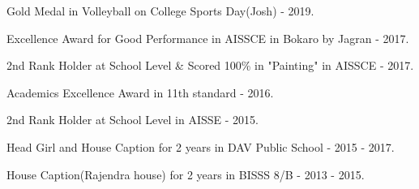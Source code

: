 \documentclass[]{deedy-resume-openfont}
\begin{document}
\begin{minipage}[t]{0.66\textwidth}
\location{}
\begin{tightemize}
\item Gold Medal in Volleyball on College Sports Day(Josh) - 2019.\\
\end{tightemize}
\sectionsep

\location{} 
\begin{tightemize}
\item Excellence Award for Good Performance in AISSCE
in Bokaro by Jagran - 2017. \\
\item 2nd Rank Holder at School Level \& Scored 100\% in "Painting" in AISSCE - 2017.\\
\item Academics Excellence Award in 11th standard - 2016.\\
\item 2nd Rank Holder at School Level in AISSE - 2015.\\
\item Head Girl and House Caption for 2 years in DAV Public School - 2015 - 2017.\\
\item House Caption(Rajendra house) for 2 years in BISSS 8/B - 2013 - 2015. \\
\end{tightemize}



\end{minipage} 
\end{document}
